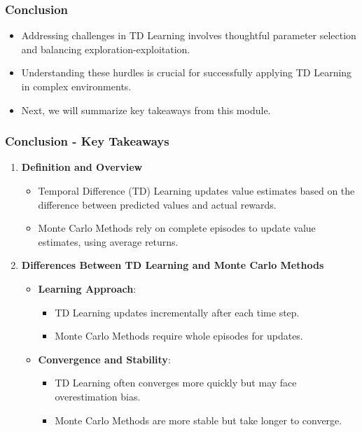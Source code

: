 \documentclass[aspectratio=169]{beamer}
\begin{document}
\begin{frame}[fragile]
    \frametitle{Conclusion}
    \begin{itemize}
        \item Addressing challenges in TD Learning involves thoughtful parameter selection and balancing exploration-exploitation.
        \item Understanding these hurdles is crucial for successfully applying TD Learning in complex environments.
        \item Next, we will summarize key takeaways from this module.
    \end{itemize}
\end{frame}

\begin{frame}[fragile]
    \frametitle{Conclusion - Key Takeaways}
    \begin{enumerate}
        \item \textbf{Definition and Overview}
        \begin{itemize}
            \item Temporal Difference (TD) Learning updates value estimates based on the difference between predicted values and actual rewards.
            \item Monte Carlo Methods rely on complete episodes to update value estimates, using average returns.
        \end{itemize}
        
        \item \textbf{Differences Between TD Learning and Monte Carlo Methods}
        \begin{itemize}
            \item \textbf{Learning Approach}:
            \begin{itemize}
                \item TD Learning updates incrementally after each time step.
                \item Monte Carlo Methods require whole episodes for updates.
            \end{itemize}

            \item \textbf{Convergence and Stability}:
            \begin{itemize}
                \item TD Learning often converges more quickly but may face overestimation bias.
                \item Monte Carlo Methods are more stable but take longer to converge.
            \end{itemize}
        \end{itemize}
    \end{enumerate}
\end{frame}
\end{document}

